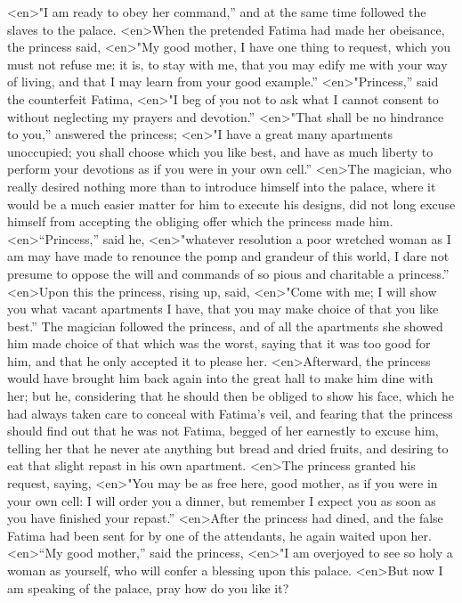 <en>"I am ready to obey her command,” and at the same time followed the slaves to the palace.
<en>When the pretended Fatima had made her obeisance, the princess said,
<en>"My good mother, I have one thing to request, which you must not refuse me: it is, to stay with me, that you may edify me with your way of living, and that I may learn from your good example.”
<en>"Princess,” said the counterfeit Fatima,
<en>"I beg of you not to ask what I cannot consent to without neglecting my prayers and devotion.”
<en>"That shall be no hindrance to you,” answered the princess;
<en>"I have a great many apartments unoccupied; you shall choose which you like best, and have as much liberty to perform your devotions as if you were in your own cell.”
<en>The magician, who really desired nothing more than to introduce himself into the palace, where it would be a much easier matter for him to execute his designs, did not long excuse himself from accepting the obliging offer which the princess made him.
<en>“Princess,” said he,
<en>"whatever resolution a poor wretched woman as I am may have made to renounce the pomp and grandeur of this world, I dare not presume to oppose the will and commands of so pious and charitable a princess.”
<en>Upon this the princess, rising up, said,
<en>"Come with me; I will show you what vacant apartments I have, that you may make choice of that you like best.” The magician followed the princess, and of all the apartments she showed him made choice of that which was the worst, saying that it was too good for him, and that he only accepted it to please her.
<en>Afterward, the princess would have brought him back again into the great hall to make him dine with her; but he, considering that he should then be obliged to show his face, which he had always taken care to conceal with Fatima’s veil, and fearing that the princess should find out that he was not Fatima, begged of her earnestly to excuse him, telling her that he never ate anything but bread and dried fruits, and desiring to eat that slight repast in his own apartment.
<en>The princess granted his request, saying,
<en>"You may be as free here, good mother, as if you were in your own cell: I will order you a dinner, but remember I expect you as soon as you have finished your repast.”
<en>After the princess had dined, and the false Fatima had been sent for by one of the attendants, he again waited upon her.
<en>“My good mother,” said the princess,
<en>"I am overjoyed to see so holy a woman as yourself, who will confer a blessing upon this palace.
<en>But now I am speaking of the palace, pray how do you like it?
